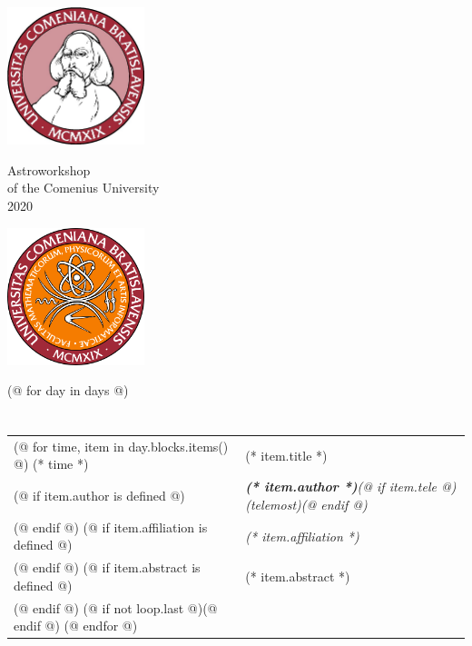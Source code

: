 \documentclass[a4paper]{report}
\begin{document}
    \begin{minipage}{\textwidth}
        \begin{minipage}{0.2\textwidth}
            \includegraphics[width=40mm]{input/logo.jpg}
        \end{minipage}
        \begin{minipage}{0.5\textwidth}
            \centering
            \Huge
            Astroworkshop\\
            \large
            of the Comenius University\\
            2020
        \end{minipage}
        \begin{minipage}{0.2\textwidth}
            \includegraphics[width=40mm]{input/fmfi.png}
        \end{minipage}
    \end{minipage}

    (@ for day in days @)
        \section{\color[rgb]{0, 0.1, 0.4}{(* day.title *)}}

        \begin{tabularx}{\textwidth}{>{}p{2cm} >{\RaggedRight}X}
            \toprule
            (@ for time, item in day.blocks.items() @)
                {\Large (* time *)} & {\Large (* item.title *)} \\
                    (@ if item.author is defined @)
                        & \textit{\textbf{(* item.author *)}(@ if item.tele @) (telemost)(@ endif @)} \\
                    (@ endif @)
                    (@ if item.affiliation is defined @)
                        & \textit{(* item.affiliation *)} \\
                    (@ endif @)
                    (@ if item.abstract is defined @)
                        & (* item.abstract *) \\
                    (@ endif @)
                    (@ if not loop.last @)\midrule(@ endif @)
            (@ endfor @)
            \bottomrule
        \end{tabularx}
\end{document}
